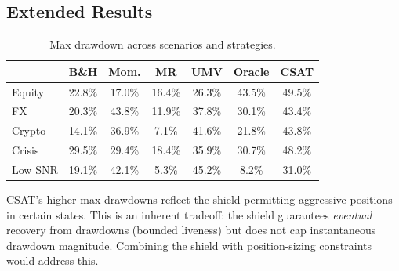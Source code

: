 \documentclass[11pt]{article}
\begin{document}
\subsection{Extended Results}

\begin{table}[h]
\centering
\caption{Max drawdown across scenarios and
strategies.}\label{tab:maxdd}
\small
\begin{tabular}{@{}lcccccc@{}}
\toprule
& B\&H & Mom. & MR & UMV & Oracle & CSAT \\
\midrule
Equity  & 22.8\% & 17.0\% & 16.4\% & 26.3\% & 43.5\% & 49.5\% \\
FX      & 20.3\% & 43.8\% & 11.9\% & 37.8\% & 30.1\% & 43.4\% \\
Crypto  & 14.1\% & 36.9\% &  7.1\% & 41.6\% & 21.8\% & 43.8\% \\
Crisis  & 29.5\% & 29.4\% & 18.4\% & 35.9\% & 30.7\% & 48.2\% \\
Low SNR & 19.1\% & 42.1\% &  5.3\% & 45.2\% &  8.2\% & 31.0\% \\
\bottomrule
\end{tabular}
\end{table}

CSAT's higher max drawdowns reflect the shield permitting aggressive
positions in certain states.  This is an inherent tradeoff: the
shield guarantees \emph{eventual} recovery from drawdowns (bounded
liveness) but does not cap instantaneous drawdown magnitude.
Combining the shield with position-sizing constraints would address
this.
\end{document}
